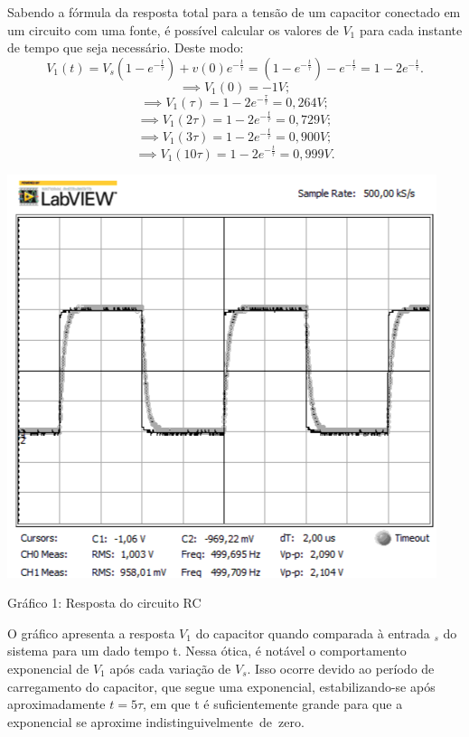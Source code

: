 \documentclass[a4 paper]{article}
\begin{document}
Sabendo a fórmula da resposta total para a tensão de um capacitor conectado em um circuito com uma fonte, é possível calcular os valores de $V_1$ para cada instante de tempo que seja necessário. Deste modo:
\[	V_1(t)=V_s(1-e^{-\frac{t}{\tau}})+v(0)e^{-\frac{t}{\tau}}=(1-e^{-\frac{t}{\tau}})-e^{-\frac{t}{\tau}}=1-2e^{-\frac{t}{\tau}}.\]
\[\implies V_1(0)= -1 V;\] 
\[\implies V_1(\tau)= 1-2e^{-\frac{\tau}{\tau}}=0,264 V;   \]
\[\implies V_1(2\tau)= 1-2e^{-\frac{t}{\tau}}=0,729 V; \]
\[\implies V_1(3\tau)= 1-2e^{-\frac{t}{\tau}}=0,900 V; \]
\[\implies V_1(10\tau)=1-2e^{-\frac{t}{\tau}}=0,999V.\]

\newpage
\begin{table}[h]
\centering
\includegraphics[scale=0.6]{rgadicoas/rgadicoa}
\end{table}

\begin{center}
Gráfico 1: Resposta do circuito RC
\end{center}

O gráfico apresenta a resposta $V_1$ do capacitor quando comparada à entrada $_s$ do sistema para um dado tempo t. Nessa ótica, é notável o comportamento exponencial de $V_1$ após cada variação de $V_s$. Isso ocorre devido ao período de carregamento do capacitor, que segue uma exponencial, estabilizando-se após aproximadamente $t=5\tau$, em que t é suficientemente grande para que a exponencial se aproxime indistinguivelmente de zero.
\end{document}
